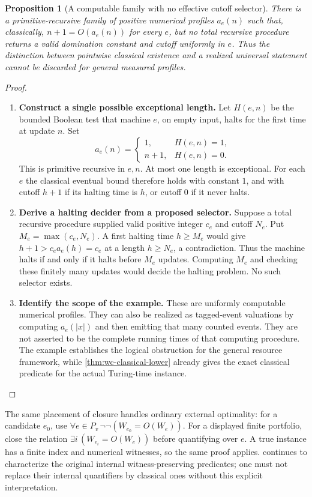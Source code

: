 \documentclass[11pt,a4paper]{article}
\numberwithin{algorithm}{section}
\numberwithin{equation}{section}
\newtheorem{proposition}[proposition]{Proposition}
\theoremstyle{definition}
\theoremstyle{remark}
\theoremstyle{plain}
\theoremstyle{definition}
\theoremstyle{plain}
\begin{document}
\begin{proposition}[A computable family with no effective cutoff selector]
\label{prop:wc-cutoff-selector}
There is a primitive-recursive family of positive numerical profiles
$a_e(n)$ such that, classically, $n+1=O(a_e(n))$ for every $e$, but
no total recursive procedure returns a valid domination constant and
cutoff uniformly in $e$. Thus the distinction between pointwise
classical existence and a realized universal statement cannot be
discarded for general measured profiles.
\end{proposition}
\begin{proof}\leavevmode
\begin{enumerate}[leftmargin=*,align=left]
\item \textbf{Construct a single possible exceptional length.}
Let $H(e,n)$ be the bounded Boolean test that machine $e$, on empty
input, halts for the first time at update $n$. Set
\[
 a_e(n)=\begin{cases}1,&H(e,n)=1,\\ n+1,&H(e,n)=0.\end{cases}
\]
This is primitive recursive in $e,n$. At most one length is
exceptional. For each $e$ the classical eventual bound therefore
holds with constant $1$, and with cutoff $h+1$ if its halting time
is $h$, or cutoff $0$ if it never halts.
\item \textbf{Derive a halting decider from a proposed selector.}
Suppose a total recursive procedure supplied valid positive integer
$c_e$ and cutoff $N_e$. Put $M_e=\max(c_e,N_e)$. A first halting
time $h\ge M_e$ would give
$h+1>c_e a_e(h)=c_e$ at a length $h\ge N_e$, a contradiction.
Thus the machine halts if and only if it halts before $M_e$ updates.
Computing $M_e$ and checking these finitely many updates would
decide the halting problem. No such selector exists.
\item \textbf{Identify the scope of the example.}
These are uniformly computable numerical profiles. They can also
be realized as tagged-event valuations by computing $a_e(|x|)$ and
then emitting that many counted events. They are not asserted to be
the complete running times of that computing procedure. The example
establishes the logical obstruction for the general resource
framework, while \cref{thm:wc-classical-lower} already gives the exact
classical predicate for the actual Turing-time instance.
\end{enumerate}
\end{proof}

The same placement of closure handles ordinary external optimality:
for a candidate $e_0$, use
$\forall e\in P_v\,\neg\neg(W_{e_0}=O(W_e))$. For a displayed
finite portfolio, close the relation
$\exists i\,(W_{e_i}=O(W_e))$ before quantifying over $e$.
A true instance has a finite index and numerical witnesses, so the
same proof applies.  continues to characterize
the original internal witness-preserving predicates;
one must not replace their internal quantifiers by classical ones
without this explicit interpretation.
\end{document}
